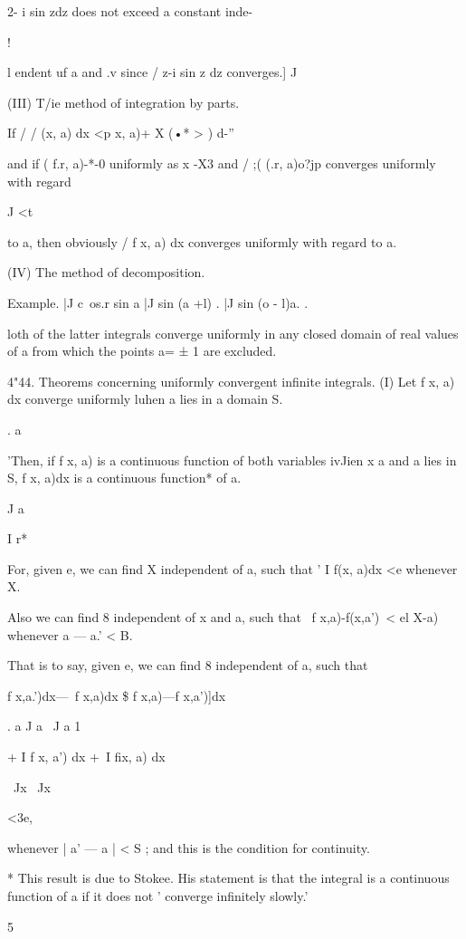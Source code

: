 2- i sin zdz does not exceed a constant inde-

!

l endent uf a and .v since / z-i sin z dz converges.] J

(III) T/ie method of integration by parts.

If / / (x, a) dx <p x, a)+ X (•* > ) d-''

and if ( f.r, a)-*-0 uniformly as x -X3 and / ;( (.r, a)o?jp converges
uniformly with regard

J <t

to a, then obviously / f x, a) dx converges uniformly with regard to
a.

(IV) The method of decomposition.

Example. |J c\ os.r sin a |J sin (a +l) . |J sin (o - l)a. .

loth of the latter integrals converge uniformly in any closed domain
of real values of a from which the points a= ± 1 are excluded.

4"44. Theorems concerning uniformly convergent infinite integrals. (I)
Let f x, a) dx converge uniformly luhen a lies in a domain S.

. a

'Then, if f x, a) is a continuous function of both variables ivJien x
a and a lies in S, f x, a)dx is a continuous function* of a.

J a

I r*

For, given e, we can find X independent of a, such that ' I f(x, a)dx
<e whenever X.

Also we can find 8 independent of x and a, such that \ f x,a)-f(x,a')\
< el X-a) whenever a — a.' < B.

That is to say, given e, we can find 8 independent of a, such that

f x,a.')dx—\ f x,a)dx \$ f x,a)—f x,a')]dx\

. a J a \ J a 1

+ I f x, a') dx +\ I fix, a) dx

\ Jx \ Jx

<3e,

whenever | a' — a | < S ; and this is the condition for continuity.

* This result is due to Stokee. His statement is that the integral is
a continuous function of a if it does not ' converge infinitely
slowly.'



5



